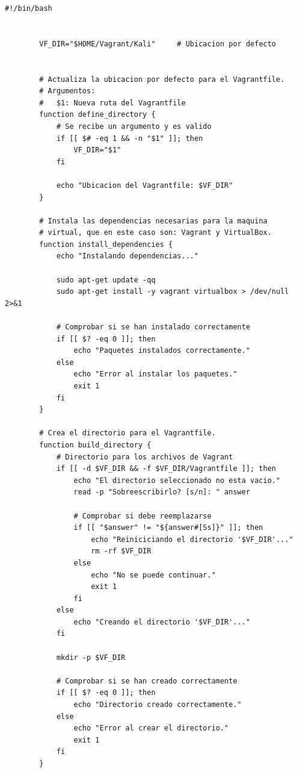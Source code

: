            \begin{lstlisting}[style=bash_style, basicstyle=\ttfamily\scriptsize]
        #!/bin/bash


        VF_DIR="$HOME/Vagrant/Kali"     # Ubicacion por defecto


        # Actualiza la ubicacion por defecto para el Vagrantfile.
        # Argumentos:
        #   $1: Nueva ruta del Vagrantfile
        function define_directory {
            # Se recibe un argumento y es valido
            if [[ $# -eq 1 && -n "$1" ]]; then
                VF_DIR="$1"
            fi

            echo "Ubicacion del Vagrantfile: $VF_DIR"
        }

        # Instala las dependencias necesarias para la maquina
        # virtual, que en este caso son: Vagrant y VirtualBox.
        function install_dependencies {
            echo "Instalando dependencias..."

            sudo apt-get update -qq
            sudo apt-get install -y vagrant virtualbox > /dev/null 2>&1

            # Comprobar si se han instalado correctamente
            if [[ $? -eq 0 ]]; then
                echo "Paquetes instalados correctamente."
            else
                echo "Error al instalar los paquetes."
                exit 1
            fi
        }

        # Crea el directorio para el Vagrantfile.
        function build_directory {
            # Directorio para los archivos de Vagrant
            if [[ -d $VF_DIR && -f $VF_DIR/Vagrantfile ]]; then
                echo "El directorio seleccionado no esta vacio."
                read -p "Sobreescribirlo? [s/n]: " answer

                # Comprobar si debe reemplazarse
                if [[ "$answer" != "${answer#[Ss]}" ]]; then
                    echo "Reiniciciando el directorio '$VF_DIR'..."
                    rm -rf $VF_DIR
                else
                    echo "No se puede continuar."
                    exit 1
                fi
            else
                echo "Creando el directorio '$VF_DIR'..."
            fi

            mkdir -p $VF_DIR

            # Comprobar si se han creado correctamente
            if [[ $? -eq 0 ]]; then
                echo "Directorio creado correctamente."
            else
                echo "Error al crear el directorio."
                exit 1
            fi
        }


\end{lstlisting}

